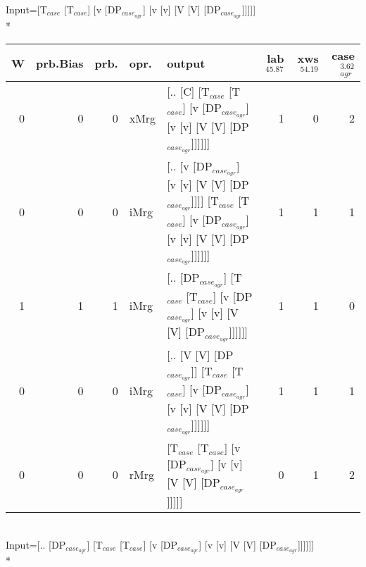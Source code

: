 \begingroup\scriptsize Input=[T$_{case}$ [T$_{case}$] [v [DP$_{case_{agr}}$] [v [v] [V [V] [DP$_{case_{agr}}$]]]]]\\*
\begin{tabularx}{\linewidth}{rrrlXrrr}
\hline
   W &   prb.Bias &   prb. & opr.   & output                                                                                                                 &   lab$^{45.87}$ &   xws$^{54.19}$ &   case$_{agr}^{3.62}$ \\
\hline
   0 &       0 &   0 & xMrg & [.. [C] [T$_{case}$ [T$_{case}$] [v [DP$_{case_{agr}}$] [v [v] [V [V] [DP$_{case_{agr}}$]]]]]]                                             &             1 &             0 &                  2 \\
   0 &       0 &   0 & iMrg & [.. [v [DP$_{case_{agr}}$] [v [v] [V [V] [DP$_{case_{agr}}$]]]] [T$_{case}$ [T$_{case}$] [v [DP$_{case_{agr}}$] [v [v] [V [V] [DP$_{case_{agr}}$]]]]]] &             1 &             1 &                  1 \\
   1 &       1 &   1 & iMrg & [.. [DP$_{case_{agr}}$] [T$_{case}$ [T$_{case}$] [v [DP$_{case_{agr}}$] [v [v] [V [V] [DP$_{case_{agr}}$]]]]]]                                   &             1 &             1 &                  0 \\
   0 &       0 &   0 & iMrg & [.. [V [V] [DP$_{case_{agr}}$]] [T$_{case}$ [T$_{case}$] [v [DP$_{case_{agr}}$] [v [v] [V [V] [DP$_{case_{agr}}$]]]]]]                           &             1 &             1 &                  1 \\
   0 &       0 &   0 & rMrg & [T$_{case}$ [T$_{case}$] [v [DP$_{case_{agr}}$] [v [v] [V [V] [DP$_{case_{agr}}$]]]]]                                                      &             0 &             1 &                  2 \\
\hline
\end{tabularx}\endgroup\\
\begingroup\scriptsize Input=[.. [DP$_{case_{agr}}$] [T$_{case}$ [T$_{case}$] [v [DP$_{case_{agr}}$] [v [v] [V [V] [DP$_{case_{agr}}$]]]]]]\\*
